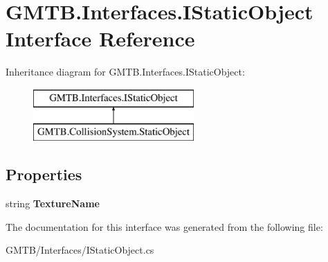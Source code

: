 \hypertarget{interface_g_m_t_b_1_1_interfaces_1_1_i_static_object}{}\section{G\+M\+T\+B.\+Interfaces.\+I\+Static\+Object Interface Reference}
\label{interface_g_m_t_b_1_1_interfaces_1_1_i_static_object}
Inheritance diagram for G\+M\+T\+B.\+Interfaces.\+I\+Static\+Object\+:\begin{figure}[H]
\begin{center}
\leavevmode
\includegraphics[height=2.000000cm]{interface_g_m_t_b_1_1_interfaces_1_1_i_static_object}
\end{center}
\end{figure}
\subsection*{Properties}
\begin{DoxyCompactItemize}
\item 
\mbox{\label{interface_g_m_t_b_1_1_interfaces_1_1_i_static_object_a24368c0e69bab55fadc2e1d8b083c34c}} 
string {\bfseries Texture\+Name}
\end{DoxyCompactItemize}


The documentation for this interface was generated from the following file\+:\begin{DoxyCompactItemize}
\item 
G\+M\+T\+B/\+Interfaces/I\+Static\+Object.\+cs\end{DoxyCompactItemize}
